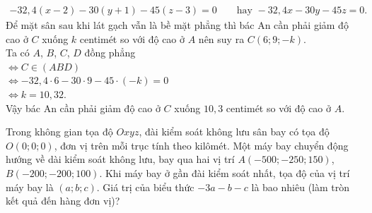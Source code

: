 \begin{ex}
{\begin{eqnarray*}
			-32{,}4 (x-2)-30(y+1)-45(z-3)=0 \qquad \text{hay } -32{,}4 x -30y -45z=0.
		\end{eqnarray*}
		Để mặt sân sau khi lát gạch vẫn là bề mặt phẳng thì bác An cần phải giảm độ cao ở $C$ xuống $k$ centimét so với độ cao ở $A$ nên suy ra $C(6; 9 ; -k)$.\\
		Ta có $A$, $B$, $C$, $D$ đồng phẳng\\
		$\Leftrightarrow C \in (ABD)$\\
		$\Leftrightarrow -32{,}4\cdot 6 -30 \cdot 9 -45\cdot (-k)=0$\\
		$\Leftrightarrow k=10{,}32$.\\
		Vậy bác An cần phải giảm độ cao ở $C$ xuống $10{,}3$ centimét so với độ cao ở $A$.
}\end{ex}

\begin{ex}%
	Trong không gian tọa độ $O x y z$, đài kiểm soát không lưu sân bay có tọa độ $O (0; 0; 0)$, đơn vị trên mỗi trục tính theo kilômét. Một máy bay chuyển động hướng về dài kiểm soát không lưu, bay qua hai vị trí $A \left(-500; -250; 150\right)$, $B \left(-200; -200; 100\right)$. Khi máy bay ở gần đài kiểm soát nhất, tọa độ của vị trí máy bay là $\left(a; b; c\right)$. Giá trị của biểu thức $-3a - b -c$ là bao nhiêu (làm tròn kết quả đến hàng đơn vị)? 
\end{ex}

